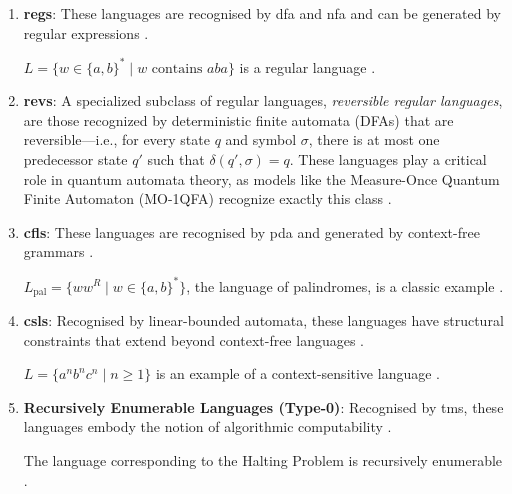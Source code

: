 \begin{enumerate}
    \item \textbf{\glspl{reg}}:  
    These languages are recognised by \gls{dfa} and \gls{nfa} and can be generated by regular expressions \cite{sipser2013introduction}. 
    \begin{example}
    $L = \{w \in \{a, b\}^\ast \mid w \text{ contains } aba\}$ is a regular language \cite{sipser2013introduction}.
    \end{example}

    \item \textbf{\glspl{rev}}:
    A specialized subclass of regular languages, \textit{reversible regular languages}, are those recognized by deterministic finite automata (DFAs) that are reversible—i.e., for every state \( q \) and symbol \( \sigma \), there is at most one predecessor state \( q' \) such that \( \delta(q', \sigma) = q \). These languages play a critical role in quantum automata theory, as models like the Measure-Once Quantum Finite Automaton (MO-1QFA) recognize exactly this class \cite{kondacs1997power}.
    
    \item \textbf{\glspl{cfl}}:  
    These languages are recognised by \gls{pda} and generated by context-free grammars \cite{chomsky1956three, sipser2013introduction}.  
    \begin{example}
    $L_{\text{pal}} = \{ww^R \mid w \in \{a, b\}^\ast\}$, the language of palindromes, is a classic example \cite{chomsky1956three}.
    \end{example}

    \item \textbf{\glspl{csl}}:  
    Recognised by linear-bounded automata, these languages have structural constraints that extend beyond context-free languages \cite{chomsky1956three, sipser2013introduction}.  
    \begin{example}
    $L = \{a^n b^n c^n \mid n \geq 1\}$ is an example of a context-sensitive language \cite{chomsky1956three}.
    \end{example}

    \item \textbf{Recursively Enumerable Languages (Type-0)}:  
    Recognised by \glspl{tm}, these languages embody the notion of algorithmic computability \cite{sipser2013introduction, turing1936computable}.  
    \begin{example}
    The language corresponding to the Halting Problem is recursively enumerable \cite{sipser2013introduction}.
    \end{example}


\end{enumerate}
